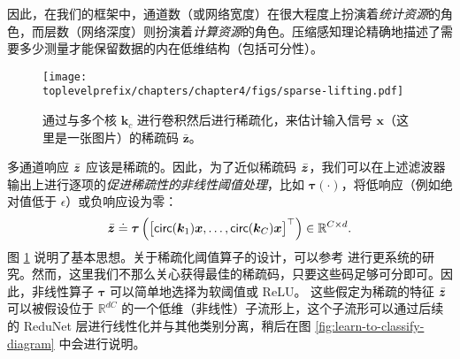 \documentclass[../../book-main.tex]{subfiles}
\begin{document}
因此，在我们的框架中，通道数（或网络宽度）在很大程度上扮演着{\em 统计资源}的角色，而层数（网络深度）则扮演着{\em 计算资源}的角色。压缩感知理论精确地描述了需要多少测量才能保留数据的内在低维结构（包括可分性）\cite{Wright-Ma-2021}。%

\begin{figure}[t]
	\centerline{
\texttt{[image: \\toplevelprefix/chapters/chapter4/figs/sparse-lifting.pdf]}}
\caption{通过与多个核 $\bm k_c$ 进行卷积然后进行稀疏化，来估计输入信号 $\bm x$（这里是一张图片）的稀疏码 $\bar{\bm z}$。}
		\label{fig:multi-channel-sparse-lifting}
\end{figure}
多通道响应 $\bar {\bm{z}}$ 应该是稀疏的。因此，为了近似稀疏码 $\bar {\bm{z}}$，我们可以在上述滤波器输出上进行逐项的{\em 促进稀疏性的非线性阈值处理}，比如 $\bm \tau(\cdot)$，将低响应（例如绝对值低于 $\epsilon$）或负响应设为零：
\begin{equation}
\bar {\bm{z}} \doteq \bm \tau \left( \big[\mathsf{circ}(\bm k_1) \bm{x}, \ldots, \mathsf{circ}(\bm k_C) \bm{x} \big]^\top \right) \in \mathbb{R}^{C \times d}.
\label{eqn:sparse-lifting}
\end{equation}
图 \ref{fig:multi-channel-sparse-lifting} 说明了基本思想。关于稀疏化阈值算子的设计，可以参考 \cite{Analysis-Filter} 进行更系统的研究。然而，这里我们不那么关心获得最佳的稀疏码，只要这些码足够可分即可。因此，非线性算子 $\bm \tau$ 可以简单地选择为软阈值或 ReLU。
这些假定为稀疏的特征 $\bar {\bm{z}}$ 可以被假设位于 $\mathbb{R}^{dC}$ 的一个低维（非线性）子流形上，这个子流形可以通过后续的 ReduNet 层进行线性化并与其他类别分离，稍后在图 \ref{fig:learn-to-classify-diagram} 中会进行说明。
\end{document}
